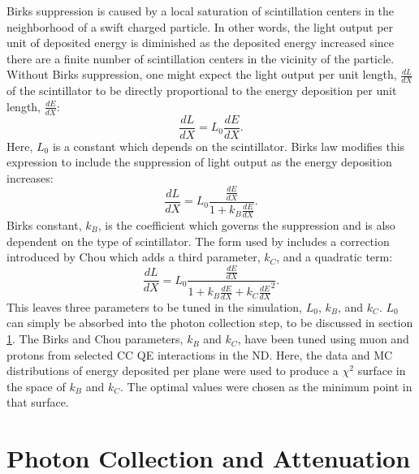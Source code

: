 Birks suppression is caused by a local saturation of scintillation centers in the neighborhood of a swift charged particle.  In other words, the light output per unit of deposited energy is diminished as the deposited energy increased since there are a finite number of scintillation centers in the vicinity of the particle.  Without Birks suppression, one might expect the light output per unit length, $\frac{dL}{dX}$ of the scintillator to be directly proportional to the energy deposition per unit length, $\frac{dE}{dX}$:
\begin{equation}
\frac{dL}{dX} = L_0  \frac{dE}{dX}.
\end{equation}
Here, $L_0$ is a constant which depends on the scintillator.  Birks law modifies this expression to include the suppression of light output as the energy deposition increases:
\begin{equation}
\frac{dL}{dX} = L_0  \frac{\frac{dE}{dX}}{1+ k_B \frac{dE}{dX}}.
\end{equation}
Birks constant, $k_B$, is the coefficient which governs the suppression and is also dependent on the type of scintillator.  The form used by \nova includes a correction introduced by Chou \cite{chou1952nature} which adds a third parameter, $k_C$, and a quadratic term:
\begin{equation}
\frac{dL}{dX} = L_0  \frac{\frac{dE}{dX}}{1+ k_B \frac{dE}{dX} + k_C \frac{dE}{dX}^2}.
\end{equation}
This leaves three parameters to be tuned in the simulation, $L_0$, $k_B$, and $k_C$.  $L_0$ can simply be absorbed into the photon collection step, to be discussed in section \ref{photoncoll}.  The Birks and Chou parameters, $k_B$ and $k_C$, have been tuned using muon and protons from selected \numu CC QE interactions in the ND.  Here, the data and MC distributions of energy deposited per plane were used to produce a $\chi^2$ surface in the space of $k_B$ and $k_C$.  The optimal values were chosen as the minimum point in that surface.


\section{Photon Collection and Attenuation}
\label{photoncoll}

